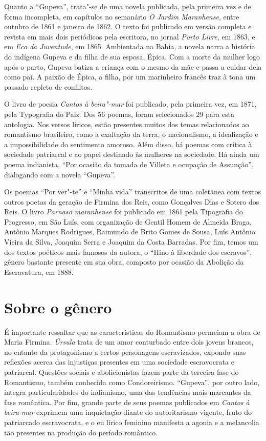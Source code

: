 Quanto a ``Gupeva'', trata"-se de uma novela publicada, pela primeira vez
e de forma incompleta, em capítulos no semanário \emph{O Jardim
Maranhense}, entre outubro de 1861 e janeiro de 1862. O texto foi
publicado em versão completa e revista em mais dois periódicos pela
escritora, no jornal \emph{Porto Livre}, em 1863, e em \emph{Eco da
Juventude}, em 1865. Ambientada na Bahia, a novela narra a história do
indígena Gupeva e da filha de sua esposa, Épica. Com a morte da mulher
logo após o parto, Gupeva batiza a criança com o mesmo da mãe e passa a
cuidar dela como pai. A paixão de Épica, a filha, por um marinheiro
francês traz à tona um passado repleto de conflitos.

O livro de poesia \emph{Cantos à beira"-mar} foi publicado, pela primeira
vez, em 1871, pela Typografia do Paiz. Dos 56 poemas, foram selecionados
29 para esta antologia. Nos versos líricos, estão presentes muitos dos
temas relacionados ao romantismo brasileiro, como a exaltação da terra,
o nacionalismo, a idealização e a impossibilidade do sentimento amoroso.
Além disso, há poemas com crítica à sociedade patriarcal e ao papel
destinado às mulheres na sociedade. Há ainda um poema indianista, ``Por
ocasião da tomada de Villeta e ocupação de Assunção'', dialogando com a
novela ``Gupeva''.

Os poemas ``Por ver"-te'' e ``Minha vida'' transcritos de uma coletânea
com textos outros poetas da geração de Firmina dos Reis, como Gonçalves
Dias e Sotero dos Reis. O livro \emph{Parnaso maranhense} foi publicado
em 1861 pela Tipografia do Progresso, em São Luís, com organização de
Gentil Homem de Almeida Braga, Antônio Marques Rodrigues, Raimundo de
Brito Gomes de Sousa, Luís Antônio Vieira da Silva, Joaquim Serra e
Joaquim da Costa Barradas. Por fim, temos um dos textos poéticos mais
famosos da autora, o ``Hino à liberdade dos escravos'', gênero bastante
presente em sua obra, composto por ocasião da Abolição da Escravatura,
em 1888.


\section{Sobre o gênero}

É importante ressaltar que as características do Romantismo permeiam a
obra de Maria Firmina. \emph{Úrsula} trata de um amor conturbado entre
dois jovens brancos, no entanto da protagonismo a certos personagens
escravizados, expondo suas reflexões acerca das injustiças presentes em
uma sociedade escravocrata e patriarcal. Questões sociais e
abolicionistas fazem parte da terceira fase do Romantismo, também
conhecida como Condoreirismo. ``Gupeva'', por outro lado, integra
particularidades do indianismo, uma das tendências mais marcantes da
fase romântica. Por fim, grande parte de seus poemas publicados em
\emph{Cantos à beira-mar} exprimem uma inquietação diante do
autoritarismo vigente, fruto do patriarcado escravocrata, e o eu lírico
feminino manifesta a agonia e a melancolia tão presentes na produção do
período romântico.

